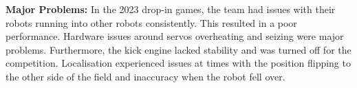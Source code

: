 \documentclass{llncs}
\begin{document}
\noindent\textbf{Major Problems:} In the 2023 drop-in games, the team had issues with their robots running into other robots consistently. This resulted in a poor performance. Hardware issues around servos overheating and seizing were major problems. Furthermore, the kick engine lacked stability and was turned off for the competition. Localisation experienced issues at times with the position flipping to the other side of the field and inaccuracy when the robot fell over.  \newline







\end{document}
